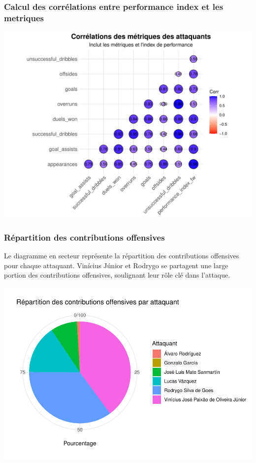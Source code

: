 \documentclass[
  6pt,
]{article}
\begin{document}
\subsubsection{Calcul des corrélations entre performance index et les
metriques}\label{calcul-des-corruxe9lations-entre-performance-index-et-les-metriques}

\begin{center}\includegraphics[width=0.8\linewidth]{Analyse_Impact_Performances_Joueurs_files/figure-latex/Correlation-forwards-1} \end{center}

\subsubsection{Répartition des contributions
offensives}\label{ruxe9partition-des-contributions-offensives}

Le diagramme en secteur représente la répartition des contributions
offensives pour chaque attaquant. Vinícius Júnior et Rodrygo se
partagent une large portion des contributions offensives, soulignant
leur rôle clé dans l'attaque.

\includegraphics[width=0.8\linewidth]{Analyse_Impact_Performances_Joueurs_files/figure-latex/repartition-forwards-1}
\end{document}
